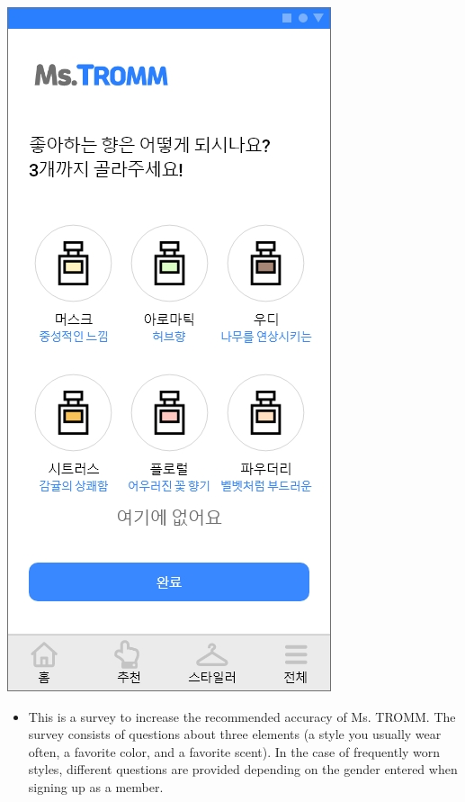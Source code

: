 \documentclass[conference]{IEEEtran}
\begin{document}
\begin{enumerate}
\begin{enumerate}
{                    \includegraphics[scale=0.24]{assets/설문지5.jpg}}
    \begin{itemize}
        \item[] This is a survey to increase the recommended accuracy of Ms. TROMM. The survey consists of questions about three elements (a style you usually wear often, a favorite color, and a favorite scent). In the case of frequently worn styles, different questions are provided depending on the gender entered when signing up as a member.\\ \\ \\ \\ \\ \\ \\ \\ \\

\end{itemize}
\end{enumerate}
\end{enumerate}
\end{document}
